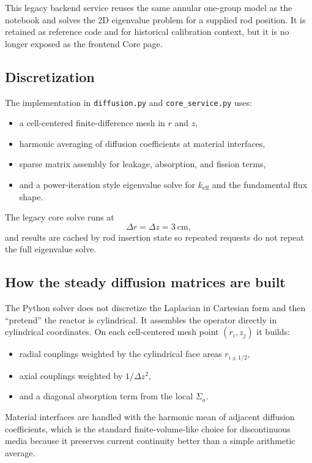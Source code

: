 \documentclass[11pt]{article}
\begin{document}
This legacy backend service reuses the same annular one-group model as the
notebook and solves the 2D eigenvalue problem for a supplied rod position.  It
is retained as reference code and for historical calibration context, but it is
no longer exposed as the frontend Core page.

\subsection{Discretization}

The implementation in \texttt{diffusion.py} and \texttt{core\_service.py} uses:
\begin{itemize}
  \item a cell-centered finite-difference mesh in $r$ and $z$,
  \item harmonic averaging of diffusion coefficients at material interfaces,
  \item sparse matrix assembly for leakage, absorption, and fission terms,
  \item and a power-iteration style eigenvalue solve for $k_{\mathrm{eff}}$ and
        the fundamental flux shape.
\end{itemize}

The legacy core solve runs at
\[
\Delta r = \Delta z = 3\ \mathrm{cm},
\]
and results are cached by rod insertion state so repeated requests do not repeat
the full eigenvalue solve.

\subsection{How the steady diffusion matrices are built}

The Python solver does not discretize the Laplacian in Cartesian form and then
``pretend'' the reactor is cylindrical.  It assembles the operator directly in
cylindrical coordinates.  On each cell-centered mesh point $(r_i,z_j)$ it builds:
\begin{itemize}
  \item radial couplings weighted by the cylindrical face areas $r_{i\pm 1/2}$,
  \item axial couplings weighted by $1/\Delta z^2$,
  \item and a diagonal absorption term from the local $\Sigma_a$.
\end{itemize}

Material interfaces are handled with the harmonic mean of adjacent diffusion
coefficients, which is the standard finite-volume-like choice for discontinuous
media because it preserves current continuity better than a simple arithmetic
average.
\end{document}
